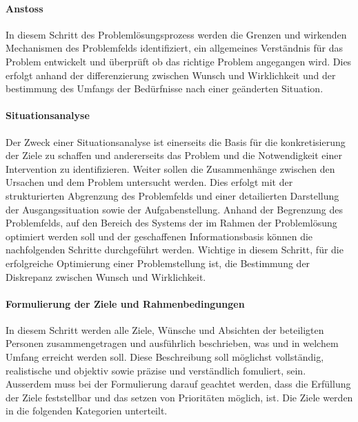 \paragraph{Anstoss} In diesem Schritt des Problemlösungsprozess werden die Grenzen und wirkenden Mechanismen des Problemfelds identifiziert, ein allgemeines Verständnis für das Problem entwickelt und überprüft ob das richtige Problem angegangen wird. Dies erfolgt anhand der differenzierung zwischen Wunsch und Wirklichkeit und der bestimmung des Umfangs der Bedürfnisse nach einer geänderten Situation.

\paragraph{Situationsanalyse} Der Zweck einer Situationsanalyse ist einerseits die Basis für die konkretisierung der Ziele zu schaffen und andererseits das Problem und die Notwendigkeit einer Intervention zu identifizieren. Weiter sollen die Zusammenhänge zwischen den Ursachen und dem Problem untersucht werden. Dies erfolgt mit der strukturierten Abgrenzung des Problemfelds und einer detailierten Darstellung der Ausgangssituation sowie der Aufgabenstellung. Anhand der Begrenzung des Problemfelds, auf den Bereich des Systems der im Rahmen der Problemlösung optimiert werden soll und der geschaffenen Informationsbasis können die nachfolgenden Schritte durchgeführt werden. Wichtige in diesem Schritt, für die erfolgreiche Optimierung einer Problemstellung ist, die Bestimmung der Diskrepanz zwischen Wunsch und Wirklichkeit.

\paragraph{Formulierung der Ziele und Rahmenbedingungen} In diesem Schritt werden alle Ziele, Wünsche und Absichten der beteiligten Personen zusammengetragen und ausführlich beschrieben, was und in welchem Umfang erreicht werden soll. Diese Beschreibung soll möglichst vollständig, realistische und objektiv sowie präzise und verständlich fomuliert, sein. Ausserdem muss bei der Formulierung darauf geachtet werden, dass die Erfüllung der Ziele feststellbar und das setzen von Prioritäten möglich, ist. 
Die Ziele werden in die folgenden Kategorien unterteilt.

